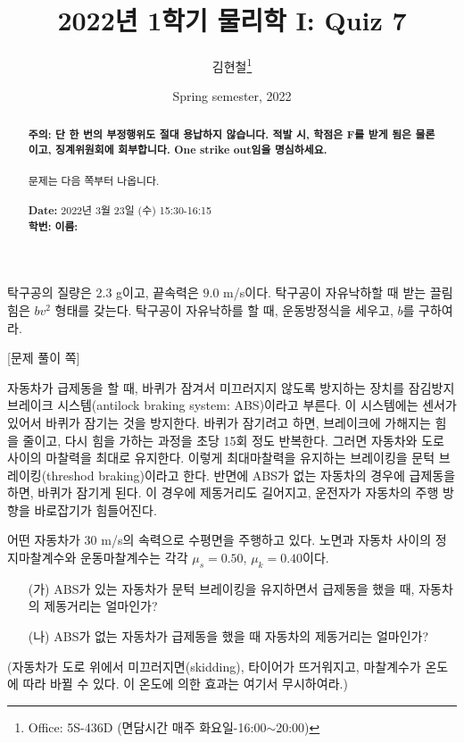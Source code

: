 \documentclass[floatfix,nofootinbib,superscriptaddress,fleqn,preprint]{revtex4}
\begin{document}
\title{\Large 2022년 1학기 물리학 I: Quiz 7}
\author{김현철\footnote{Office: 5S-436D (면담시간 매주
    화요일-16:00$\sim$20:00)}} 
\date{Spring semester, 2022}


\vspace{1.cm}
\begin{abstract}
\noindent \textbf{ {\color{red}주의}: \color{blue} 단 한 번의 부정행위도 절대
  용납하지 않습니다. 적발 시, 학점은 F를 받게 됨은 물론이고,
  징계위원회에 회부합니다. One strike out임을 명심하세요.}\\
\\
문제는 다음 쪽부터 나옵니다.  \\ \\
{\bf Date:} 2022년 3월 23일 (수) 15:30-16:15 
\\
{\bf 학번:} \hspace{4cm}
{\bf 이름:} 

\end{abstract}
\maketitle

탁구공의 질량은 2.3 g이고, 끝속력은 $9.0$ m/s이다. 탁구공이 자유낙하할
때 받는 끌림힘은 $bv^2$ 형태를 갖는다. 탁구공이 자유낙하를 할 때,
운동방정식을 세우고, $b$를 구하여라.  

\newpage

{\color{gray} [문제 풀이 쪽]}

\newpage 

 자동차가 급제동을 할 때, 바퀴가
잠겨서 미끄러지지 않도록 방지하는 장치를 잠김방지 브레이크
시스템(antilock braking system: ABS)이라고 부른다. 이 시스템에는
센서가 있어서 바퀴가 잠기는 것을 방지한다. 바퀴가 잠기려고 하면,
브레이크에 가해지는 힘을 줄이고, 다시 힘을 가하는 과정을 초당 15회
정도 반복한다. 그러면 자동차와 도로 사이의 마찰력을 최대로
유지한다. 이렇게 최대마찰력을 유지하는 브레이킹을 문턱
브레이킹(threshod braking)이라고 한다.
반면에 ABS가 없는 자동차의 경우에 급제동을 하면, 바퀴가
잠기게 된다. 이 경우에 제동거리도 길어지고, 운전자가 자동차의 주행
방향을 바로잡기가 힘들어진다.

어떤 자동차가 30 m/s의 속력으로 수평면을 주행하고 있다. 노면과 자동차
사이의 정지마찰계수와 운동마찰계수는 각각 $\mu_s=0.50$,
$\mu_k=0.40$이다. 
\begin{itemize}
\item[(가)] ABS가 있는 자동차가 문턱 브레이킹을 유지하면서 급제동을
  했을 때, 자동차의 제동거리는 얼마인가?
\item[(나)] ABS가 없는 자동차가 급제동을 했을 때 자동차의 제동거리는
  얼마인가?   
\end{itemize}
(자동차가 도로 위에서 미끄러지면(skidding), 타이어가 뜨거워지고,
마찰계수가 온도에 따라 바뀔 수 있다. 이 온도에 의한 효과는 여기서 무시하여라.)
\end{document}
